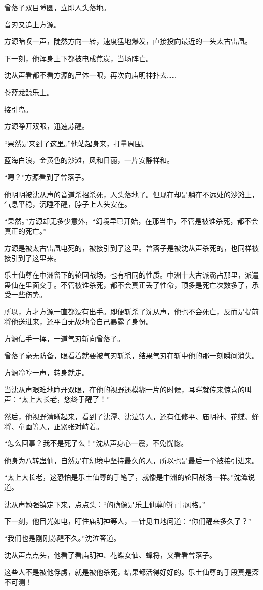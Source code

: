 \begin{this_body}
曾落子双目瞪圆，立即人头落地。

音刃又追上方源。

方源暗叹一声，陡然方向一转，速度猛地爆发，直接投向最近的一头太古雷凰。

下一刻，他浑身上下都被电成焦炭，当场阵亡。

沈从声看都不看方源的尸体一眼，再次向庙明神扑去……

苍蓝龙鲸乐土。

接引岛。

方源睁开双眼，迅速苏醒。

“果然是来到了这里。”他站起身来，打量周围。

蓝海白浪，金黄色的沙滩，风和日丽，一片安静祥和。

“嗯？”方源看到了曾落子。

他明明被沈从声的音道杀招杀死，人头落地了。但现在却是躺在不远处的沙滩上，气息平稳，沉睡不醒，脖子上人头安在。

“果然。”方源却无多少意外，“幻境早已开始，在那当中，不管是被谁杀死，都不会真正的死亡。”

方源是被太古雷凰电死的，被接引到了这里。曾落子是被沈从声杀死的，也同样被接引到了这里来。

乐土仙尊在中洲留下的轮回战场，也有相同的性质。中洲十大古派霸占那里，派遣蛊仙在里面交手。不管被谁杀死，都不会真正丢了性命，顶多是死亡次数多了，承受一些伤势。

所以，方才方源一直都没有出手。即便斩杀了沈从声，他也不会死亡，反而是提前将他送进来，还平白无故地令自己暴露了身份。

方源信手一挥，一道气刃斩向曾落子。

曾落子毫无防备，眼看着就要被气刃斩杀，结果气刃在斩中他的那一刻瞬间消失。

方源冷哼一声，转身就走。

当沈从声艰难地睁开双眼，在他的视野还模糊一片的时候，耳畔就传来惊喜的叫声：“太上大长老，您终于醒了！”

然后，他视野清晰起来，看到了沈潭、沈泣等人，还有任修平、庙明神、花蝶、蜂将、童画等人，正紧张对峙着。

“怎么回事？我不是死了么！”沈从声身心一震，不免恍惚。

他身为八转蛊仙，自然是在幻境中坚持最久的人，所以也是最后一个被接引进来。

“太上大长老，这恐怕是乐土仙尊的手笔了，就像是中洲的轮回战场一样。”沈潭说道。

沈从声勉强镇定下来，点点头：“的确像是乐土仙尊的行事风格。”

下一刻，他目光如电，盯住庙明神等人，一针见血地问道：“你们醒来多久了？”

“我们也是刚刚苏醒不久。”沈泣答道。

沈从声点点头，他看了看庙明神、花蝶女仙、蜂将，又看看曾落子。

这些人不是被他俘虏，就是被他杀死，结果都活得好好的。乐土仙尊的手段真是深不可测！

\end{this_body}

